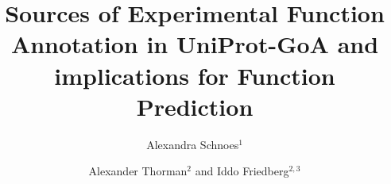 \documentclass[10pt]{bmc_article}
\newenvironment{bmcformat}{\begin{raggedright}\baselineskip20pt\sloppy\setboolean{publ}{false}}{\end{raggedright}\baselineskip20pt\sloppy}
\begin{document}
\begin{bmcformat}



\title{Sources of Experimental Function Annotation in UniProt-GoA and implications for
Function Prediction}
 


\author{Alexandra Schnoes$^1$%
      \and
         Alexander Thorman$^2$%
       and 
        Iddo Friedberg\correspondingauthor$^{2,3}$%
      }
      


\address{%
    \iid(1)Department of Bioengineering and Therapeutic Sciences, University of California San Francisco, San Francisco, CA, USA\\
    \iid(2)Department of Microbiology, Miami University, Oxford, OH USA\\
    \iid(3)Department of Computer Science and Software Engineering , Miami University, Oxford, OH USA
}%

\maketitle




\end{bmcformat}
\end{document}
